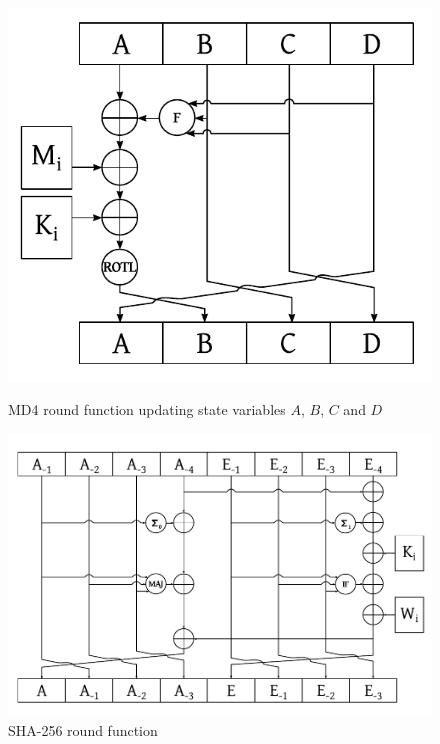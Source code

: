 \begin{figure}[p]
  \begin{center}
    \includegraphics{img/md4.pdf}
    \caption{MD4 round function updating state variables $A$, $B$, $C$ and $D$}
    \label{fig:md4-round-function}
  \end{center}
  \begin{center}
    \includegraphics[width=\textwidth]{img/sha256.pdf}
    \caption{SHA-256 round function}
    \label{fig:sha256-round-function}
  \end{center}
\end{figure}

